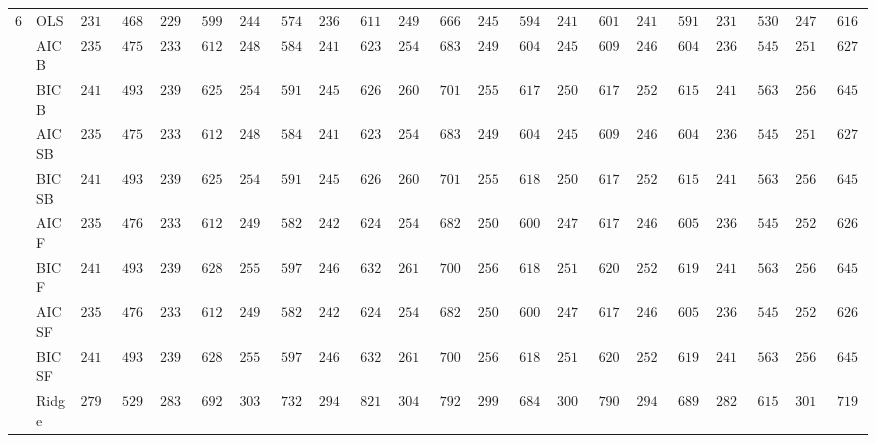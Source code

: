 \begin{tabular}{ll|ll|llllll|llllll|llllll}
6 & OLS  & $2314.26$ & $468.48$ & $2295.58$ & $599.97$ & $2447.43$ & $574.49$ & $2369.54$ & $611.07$ & $2495.68$ & $666.82$ & $2452.08$ & $594.11$ & $2414.61$ & $601.25$ & $2418.21$ & $591.93$ & $2318.47$ & $530.74$ & $2474.30$ & $616.49$ \\
 & AIC B  & $2356.52$ & $475.66$ & $2337.63$ & $612.63$ & $2488.15$ & $584.03$ & $2413.01$ & $623.12$ & $2547.33$ & $683.64$ & $2497.03$ & $604.05$ & $2454.05$ & $609.71$ & $2463.47$ & $604.90$ & $2361.68$ & $545.17$ & $2513.98$ & $627.64$ \\
 & BIC B  & $2413.76$ & $493.67$ & $2393.08$ & $625.02$ & $2549.08$ & $591.97$ & $2458.09$ & $626.63$ & $2609.52$ & $701.23$ & $2558.66$ & $617.59$ & $2508.61$ & $617.22$ & $2524.09$ & $615.35$ & $2411.66$ & $563.39$ & $2562.51$ & $645.36$ \\
 & AIC SB  & $2356.52$ & $475.66$ & $2337.63$ & $612.63$ & $2488.15$ & $584.03$ & $2413.01$ & $623.12$ & $2546.76$ & $683.47$ & $2497.03$ & $604.05$ & $2454.05$ & $609.71$ & $2463.47$ & $604.90$ & $2361.68$ & $545.17$ & $2513.98$ & $627.64$ \\
 & BIC SB  & $2413.76$ & $493.67$ & $2393.08$ & $625.02$ & $2549.08$ & $591.97$ & $2458.09$ & $626.63$ & $2609.52$ & $701.23$ & $2558.15$ & $618.16$ & $2508.61$ & $617.22$ & $2524.09$ & $615.35$ & $2411.66$ & $563.39$ & $2562.51$ & $645.36$ \\
 & AIC F  & $2357.92$ & $476.79$ & $2339.22$ & $612.80$ & $2493.90$ & $582.91$ & $2422.56$ & $624.65$ & $2549.35$ & $682.70$ & $2503.46$ & $600.41$ & $2475.68$ & $617.91$ & $2467.21$ & $605.20$ & $2367.67$ & $545.16$ & $2528.58$ & $626.87$ \\
 & BIC F  & $2413.76$ & $493.67$ & $2396.27$ & $628.23$ & $2557.38$ & $597.35$ & $2469.35$ & $632.08$ & $2610.98$ & $700.64$ & $2562.40$ & $618.59$ & $2517.49$ & $620.86$ & $2528.74$ & $619.50$ & $2414.12$ & $563.66$ & $2568.91$ & $645.60$ \\
 & AIC SF  & $2357.92$ & $476.79$ & $2339.22$ & $612.80$ & $2494.09$ & $582.73$ & $2422.56$ & $624.65$ & $2549.35$ & $682.70$ & $2503.96$ & $600.60$ & $2476.62$ & $617.68$ & $2467.47$ & $605.34$ & $2367.67$ & $545.16$ & $2529.03$ & $626.85$ \\
 & BIC SF  & $2413.76$ & $493.67$ & $2396.27$ & $628.23$ & $2557.38$ & $597.35$ & $2469.35$ & $632.08$ & $2610.98$ & $700.64$ & $2562.40$ & $618.59$ & $2517.49$ & $620.86$ & $2528.74$ & $619.50$ & $2414.12$ & $563.66$ & $2568.91$ & $645.60$ \\
 & Ridge  & $2795.38$ & $529.90$ & $2830.29$ & $692.81$ & $3038.70$ & $732.88$ & $2944.29$ & $821.55$ & $3048.87$ & $792.26$ & $2999.89$ & $684.73$ & $3008.49$ & $790.88$ & $2942.85$ & $689.35$ & $2825.52$ & $615.43$ & $3011.06$ & $719.21$ \\

\end{tabular}
